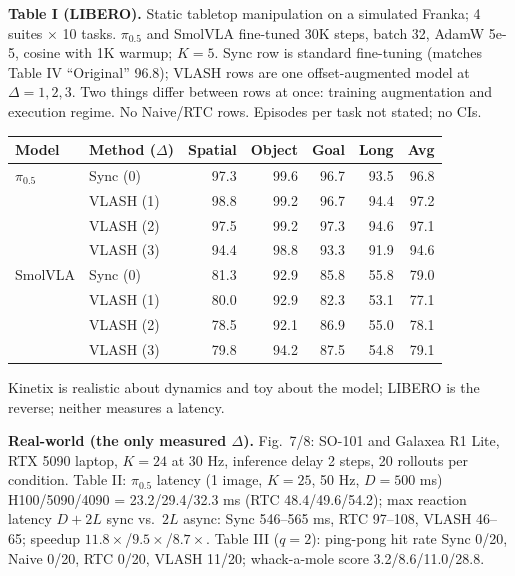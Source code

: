 \documentclass[10pt,letterpaper]{article}
\begin{document}
\textbf{Table I (LIBERO).} Static tabletop manipulation on a simulated Franka; 4 suites $\times$ 10 tasks. $\pi_{0.5}$ and SmolVLA fine-tuned 30K steps, batch 32, AdamW 5e-5, cosine with 1K warmup; $K=5$. Sync row is standard fine-tuning (matches Table IV ``Original'' 96.8); VLASH rows are one offset-augmented model at $\Delta=1,2,3$. Two things differ between rows at once: training augmentation and execution regime. No Naive/RTC rows. Episodes per task not stated; no CIs. 

\begin{center}\small
\begin{tabular}{@{}llrrrrr@{}}
\toprule
Model & Method ($\Delta$) & Spatial & Object & Goal & Long & Avg \\
\midrule
$\pi_{0.5}$ & Sync (0)  & 97.3 & 99.6 & 96.7 & 93.5 & 96.8 \\
            & VLASH (1) & 98.8 & 99.2 & 96.7 & 94.4 & 97.2 \\
            & VLASH (2) & 97.5 & 99.2 & 97.3 & 94.6 & 97.1 \\
            & VLASH (3) & 94.4 & 98.8 & 93.3 & 91.9 & 94.6 \\
\midrule
SmolVLA     & Sync (0)  & 81.3 & 92.9 & 85.8 & 55.8 & 79.0 \\
            & VLASH (1) & 80.0 & 92.9 & 82.3 & 53.1 & 77.1 \\
            & VLASH (2) & 78.5 & 92.1 & 86.9 & 55.0 & 78.1 \\
            & VLASH (3) & 79.8 & 94.2 & 87.5 & 54.8 & 79.1 \\
\bottomrule
\end{tabular}
\end{center}

Kinetix is realistic about dynamics and toy about the model; LIBERO is the reverse; neither measures a latency.

\textbf{Real-world (the only measured $\Delta$).} Fig.\ 7/8: SO-101 and Galaxea R1 Lite, RTX 5090 laptop, $K=24$ at 30 Hz, inference delay 2 steps, 20 rollouts per condition. Table II: $\pi_{0.5}$ latency (1 image, $K=25$, 50 Hz, $D=500$ ms) H100/5090/4090 = 23.2/29.4/32.3 ms (RTC 48.4/49.6/54.2); max reaction latency $D+2L$ sync vs.\ $2L$ async: Sync 546--565 ms, RTC 97--108, VLASH 46--65; speedup $11.8\times$/$9.5\times$/$8.7\times$. Table III ($q=2$): ping-pong hit rate Sync 0/20, Naive 0/20, RTC 0/20, VLASH 11/20; whack-a-mole score 3.2/8.6/11.0/28.8.
\end{document}
